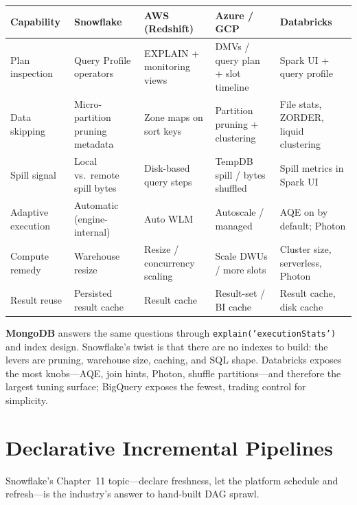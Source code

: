 \begin{center}
\footnotesize
\begin{tabular}{@{}p{2.5cm}p{2.9cm}p{2.7cm}p{2.9cm}p{2.9cm}@{}}
\toprule
\textbf{Capability} & \textbf{Snowflake} & \textbf{AWS (Redshift)} & \textbf{Azure / GCP} & \textbf{Databricks} \\
\midrule
Plan inspection & Query Profile operators & EXPLAIN + monitoring views & DMVs / query plan + slot timeline & Spark UI + query profile \\
Data skipping & Micro-partition pruning metadata & Zone maps on sort keys & Partition pruning + clustering & File stats, ZORDER, liquid clustering \\
Spill signal & Local vs.\ remote spill bytes & Disk-based query steps & TempDB spill / bytes shuffled & Spill metrics in Spark UI \\
Adaptive execution & Automatic (engine-internal) & Auto WLM & Autoscale / managed & AQE on by default; Photon \\
Compute remedy & Warehouse resize & Resize / concurrency scaling & Scale DWUs / more slots & Cluster size, serverless, Photon \\
Result reuse & Persisted result cache & Result cache & Result-set / BI cache & Result cache, disk cache \\
\bottomrule
\end{tabular}
\end{center}

\noindent \textbf{MongoDB} answers the same questions through
\texttt{explain('executionStats')} and index design. Snowflake's twist is that there are no
indexes to build: the levers are pruning, warehouse size, caching, and SQL shape. Databricks
exposes the most knobs---AQE, join hints, Photon, shuffle partitions---and therefore the largest
tuning surface; BigQuery exposes the fewest, trading control for simplicity.

\section{Declarative Incremental Pipelines}
%
Snowflake's Chapter~11 topic---declare freshness, let the platform schedule and refresh---is the
industry's answer to hand-built DAG sprawl.

